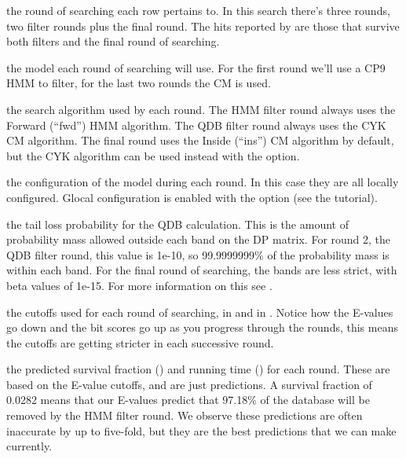 \begin{wideitem}
\item[\emprog{rnd}] the round of searching each row pertains
  to. In this search there's three rounds, two filter rounds plus
  the final round. The hits reported by  are those that
  survive both filters and the final round of searching.

\item[\emprog{mod}] the model each round of searching will use. For
  the first round we'll use a CP9 HMM to filter, for the last two
  rounds the CM is used.

\item[\emprog{alg}] the search algorithm used by each round. 
  The HMM filter round always uses the Forward (``fwd'') HMM algorithm. 
  The QDB filter round always uses the CYK CM algorithm. The final
  round uses the Inside (``ins'') CM algorithm by default, but the 
  CYK algorithm can be used instead with the  option. 

\item[\emprog{cfg}] the configuration of the model during each
  round. In this case they are all locally configured. Glocal
  configuration is enabled with the  option (see the tutorial).

\item[\emprog{beta}] the tail loss probability for the QDB
  calculation. This is the amount of probability mass allowed outside
  each band on the DP matrix. For round 2, the QDB filter round, this
  value is 1e-10, so 99.9999999\% of the probability mass is within each
  band. For the final round of searching, the bands are less strict,
  with beta values of 1e-15. For more information on this see
  \cite{NawrockiEddy07}.

\item[\emprog{cutoffs}] the cutoffs used for each round of searching,
  in  and in . Notice how the E-values go
  down and the bit scores go up as you progress through the rounds,
  this means the cutoffs are getting stricter in each successive
  round. 

\item[\emprog{predictions}] the predicted survival fraction
  () and running time () for each
  round. These are based on the E-value cutoffs, and are just
  predictions. A survival fraction of 0.0282 means that our E-values
  predict that 97.18\% of the database will be removed by the HMM
  filter round. We observe these predictions are often inaccurate by up
  to five-fold, but they are the best predictions
  that we can make currently.
\end{wideitem}

